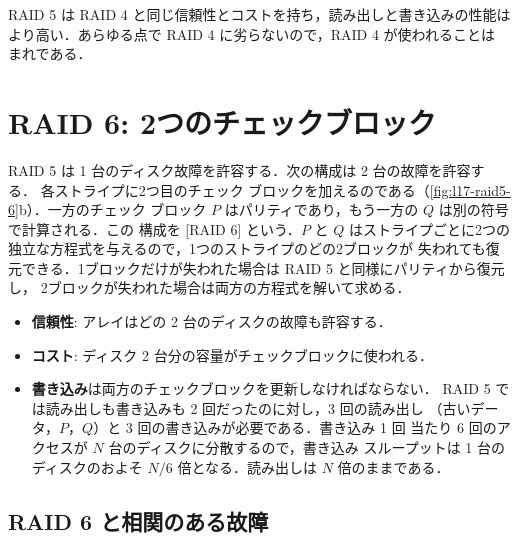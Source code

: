 \documentclass[../main.tex]{subfiles}
\begin{document}
\begin{keypoint}
  RAID 5 は RAID 4 と同じ信頼性とコストを持ち，読み出しと書き込みの性能は
  より高い．あらゆる点で RAID 4 に劣らないので，RAID 4 が使われることは
  まれである．
\end{keypoint}

\section{RAID 6: 2つのチェックブロック}
\label{sec:l17-raid6}

RAID 5 は 1 台のディスク故障を許容する．次の構成は 2 台の故障を許容する．
各ストライプに2つ目のチェック
ブロックを加えるのである（\cref{fig:l17-raid5-6}b）．一方のチェック
ブロック $P$ はパリティであり，もう一方の $Q$ は別の符号で計算される．この
構成を [RAID 6] という．$P$ と $Q$ はストライプごとに2つの
独立な方程式を与えるので，1つのストライプのどの2ブロックが
失われても復元できる．1ブロックだけが失われた場合は RAID 5 と同様にパリティから復元し，
2ブロックが失われた場合は両方の方程式を解いて求める．

\begin{itemize}
  \item \textbf{信頼性}: アレイはどの 2 台のディスクの故障も許容する．
  \item \textbf{コスト}: ディスク 2 台分の容量がチェックブロックに使われる．
  \item \textbf{書き込み}は両方のチェックブロックを更新しなければならない．
    RAID 5 では読み出しも書き込みも 2 回だったのに対し，3 回の読み出し
    （古いデータ，$P$，$Q$）と 3 回の書き込みが必要である．書き込み 1 回
    当たり 6 回のアクセスが $N$ 台のディスクに分散するので，書き込み
    スループットは 1 台のディスクのおよそ $N/6$ 倍となる．読み出しは
    $N$ 倍のままである．
\end{itemize}

\subsection{RAID 6 と相関のある故障}
\end{document}
